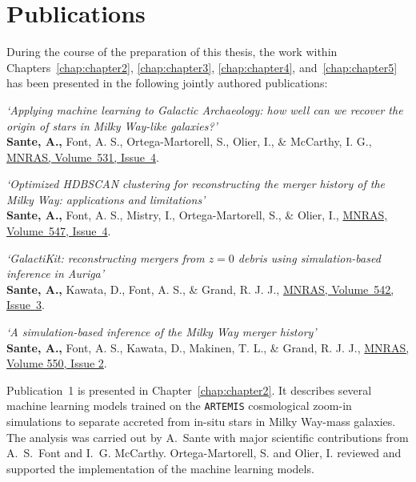 \documentclass[a4paper,12pt,oneside]{report}
\begin{document}
\chapter*{Publications}

During the course of the preparation of this thesis, the work within
Chapters~\ref{chap:chapter2}, \ref{chap:chapter3}, \ref{chap:chapter4},
and~\ref{chap:chapter5} has been presented in the following jointly authored
publications:

\bigskip

 \textit{`Applying machine learning to Galactic Archaeology: how well can we
recover the origin of stars in Milky Way-like galaxies?'}\\
\textbf{Sante, A.,} Font, A. S., Ortega-Martorell, S., Olier, I.,
\& McCarthy, I. G., \href{https://doi.org/10.1093/mnras/stae1398}{MNRAS, Volume~531, Issue~4}.

\bigskip

 \textit{`Optimized HDBSCAN clustering for reconstructing the merger history
of the Milky Way: applications and limitations'}\\
\textbf{Sante, A.,} Font, A. S., Mistry, I., Ortega-Martorell, S., \& Olier, I.,
\href{https://doi.org/10.1093/mnras/stag503}{MNRAS, Volume~547, Issue~4}.

\bigskip

 \textit{`GalactiKit: reconstructing mergers from $z=0$ debris using
simulation-based inference in Auriga'}\\
\textbf{Sante, A.,} Kawata, D., Font, A. S., \& Grand, R. J. J.,
\href{https://doi.org/10.1093/mnras/staf1343}{MNRAS, Volume~542, Issue~3}.

\bigskip

 \textit{`A simulation-based inference of the Milky Way merger history'}\\
\textbf{Sante, A.,} Font, A. S., Kawata, D., Makinen, T. L., \& Grand, R. J. J.,
\href{https://doi.org/10.1093/mnras/stag1162}{MNRAS, Volume 550, Issue 2}.

\bigskip
\bigskip

Publication~1 is presented in Chapter~\ref{chap:chapter2}. It describes
several machine learning models trained on the
\texttt{ARTEMIS} cosmological zoom-in simulations
to separate accreted from in-situ
stars in Milky Way-mass galaxies. The analysis was carried out by
A.~Sante with major scientific contributions from A.~S.~Font and I.~G. McCarthy. 
Ortega-Martorell, S. and Olier, I. reviewed and supported the implementation
of the machine learning models. 
\end{document}
